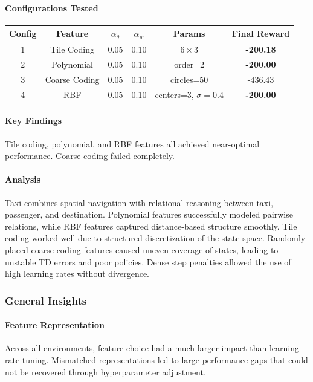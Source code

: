 \documentclass{article}
\begin{document}
\paragraph{Configurations Tested}
\begin{center}
\begin{tabular}{c c c c c c}
\hline
Config & Feature & $\alpha_\theta$ & $\alpha_w$ & Params & Final Reward \\
\hline
1 & Tile Coding & 0.05 & 0.10 & $6\times3$ & \textbf{-200.18} \\
2 & Polynomial & 0.05 & 0.10 & order=2 & \textbf{-200.00} \\
3 & Coarse Coding & 0.05 & 0.10 & circles=50 & -436.43 \\
4 & RBF & 0.05 & 0.10 & centers=3, $\sigma=0.4$ & \textbf{-200.00} \\
\hline
\end{tabular}
\end{center}

\paragraph{Key Findings}
Tile coding, polynomial, and RBF features all achieved near-optimal performance. Coarse coding failed completely.

\paragraph{Analysis}
Taxi combines spatial navigation with relational reasoning between taxi, passenger, and destination. Polynomial features successfully modeled pairwise relations, while RBF features captured distance-based structure smoothly. Tile coding worked well due to structured discretization of the state space.  
Randomly placed coarse coding features caused uneven coverage of states, leading to unstable TD errors and poor policies. Dense step penalties allowed the use of high learning rates without divergence.

\subsubsection{General Insights}

\paragraph{Feature Representation}
Across all environments, feature choice had a much larger impact than learning rate tuning. Mismatched representations led to large performance gaps that could not be recovered through hyperparameter adjustment.
\end{document}
